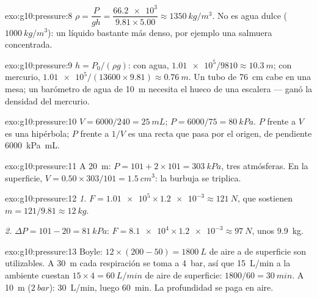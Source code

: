 \begin{solution}{exo:g10:pressure:8}
$\rho = \dfrac{P}{g h} = \dfrac{\num{66.2e3}}{9.81 \times 5.00}
\approx \qty{1350}{kg/m^3}$. No es agua dulce
($\qty{1000}{kg/m^3}$): un líquido bastante más denso, por ejemplo una
salmuera concentrada.
\end{solution}

\begin{solution}{exo:g10:pressure:9}
$h = P_0/(\rho g)$: con agua,
$\num{1.01e5}/9810 \approx \qty{10.3}{m}$; con mercurio,
$\num{1.01e5}/(13600 \times 9.81) \approx \qty{0.76}{m}$. Un tubo de
\qty{76}{cm} cabe en una mesa; un barómetro de agua de \qty{10}{m}
necesita el hueco de una escalera --- ganó la densidad del mercurio.
\end{solution}

\begin{solution}{exo:g10:pressure:10}
$V = 6000/240 = \qty{25}{mL}$; $P = 6000/75 = \qty{80}{kPa}$. $P$ frente
a $V$ es una hipérbola; $P$ frente a $1/V$ es una recta que pasa por el
origen, de pendiente \qty{6000}{kPa.mL}.
\end{solution}

\begin{solution}{exo:g10:pressure:11}
A \qty{20}{m}: $P = 101 + 2 \times 101 = \qty{303}{kPa}$, tres
atmósferas. En la superficie,
$V = 0.50 \times 303/101 = \qty{1.5}{cm^3}$: la burbuja se triplica.
\end{solution}

\begin{solution}{exo:g10:pressure:12}
\emph{1.} $F = \num{1.01e5} \times \num{1.2e-3} \approx \qty{121}{N}$,
que sostienen $m = 121/9.81 \approx \qty{12}{kg}$.

\emph{2.} $\Delta P = 101 - 20 = \qty{81}{kPa}$:
$F = \num{8.1e4} \times \num{1.2e-3} \approx \qty{97}{N}$, unos
\qty{9.9}{kg}.
\end{solution}

\begin{solution}{exo:g10:pressure:13}
Boyle: $12 \times (200 - 50) = \qty{1800}{L}$ de aire a  de
superficie son utilizables. A \qty{30}{m} cada respiración se toma a
\qty{4}{bar}, así que \qty{15}{L/min} a la  ambiente cuestan
$15 \times 4 = \qty{60}{L/min}$ de aire de superficie:
$1800/60 = \qty{30}{min}$. A \qty{10}{m} ($\qty{2}{bar}$):
\qty{30}{L/min}, luego \qty{60}{min}. La profundidad se paga en aire.
\end{solution}

